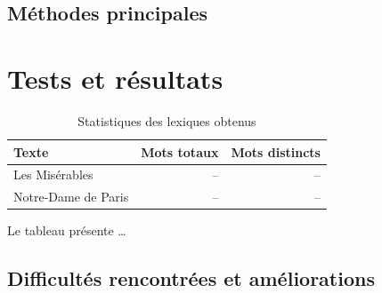 \documentclass[a4paper,12pt,french]{article}
\begin{document}
\subsection{Méthodes principales}


%



\section{Tests et résultats}

\begin{table}[ht!]
	\begin{center}
		\begin{tabular}{@{}lrr@{}}
			\toprule
			\textbf{Texte} & \textbf{Mots totaux} & \textbf{Mots distincts} \\ \midrule
			Les Misérables      & -- & -- \\
			Notre-Dame de Paris & -- & -- \\ \bottomrule
		\end{tabular}
		\caption{Statistiques des lexiques obtenus}
		\label{tab:resultats}
	\end{center}
\end{table}

Le tableau  présente \dots



\subsection{Difficultés rencontrées et améliorations}



\end{document}
